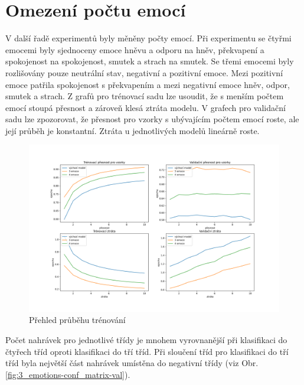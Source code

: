 \documentclass[FM,BP]{tulthesis}
\begin{document}
\section{Omezení počtu emocí}
V další řadě experimentů byly měněny počty emocí. Při experimentu se čtyřmi emocemi byly sjednoceny emoce hněvu a odporu na hněv, překvapení a spokojenost na spokojenost, smutek a strach na smutek. Se třemi emocemi byly rozlišovány pouze neutrální stav, negativní a pozitivní emoce. Mezi pozitivní emoce patřila spokojenost s překvapením a mezi negativní emoce hněv, odpor, smutek a strach. Z grafů pro trénovací sadu lze usoudit, že s menším počtem emocí stoupá přesnost a zároveň klesá ztráta modelu. V grafech pro validační sadu lze zpozorovat, že přesnost pro vzorky s ubývajícím počtem emocí roste, ale její průběh je konstantní. Ztráta u jednotlivých modelů lineárně roste.

\begin{figure}[!htbp]
\centerline{\includegraphics[scale=.5]{training_course-emotion_reduction.png}}
\caption{Přehled průběhu trénování}
\label{fig}
\end{figure}
\FloatBarrier

Počet nahrávek pro jednotlivé třídy je mnohem vyrovnanější při klasifikaci do čtyřech tříd oproti klasifikaci do tří tříd. Při sloučení tříd pro klasifikaci do tří tříd byla největší část nahrávek umístěna do negativní třídy (viz Obr. \ref{fig:3_emotions-conf_matrix-val}). 
\end{document}
